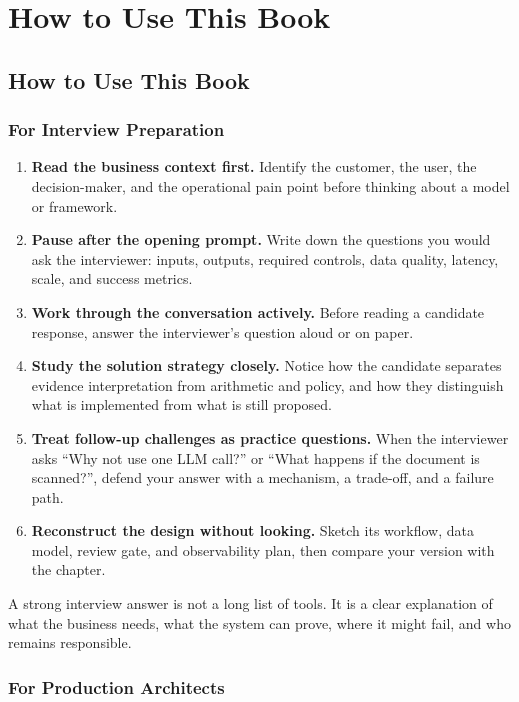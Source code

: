 \chapter*{How to Use This Book}

\section*{How to Use This Book}

\subsection*{For Interview Preparation}

\begin{enumerate}
\item \textbf{Read the business context first.} Identify the customer, the user, the decision-maker, and the operational pain point before thinking about a model or framework.
\item \textbf{Pause after the opening prompt.} Write down the questions you would ask the interviewer: inputs, outputs, required controls, data quality, latency, scale, and success metrics.
\item \textbf{Work through the conversation actively.} Before reading a candidate response, answer the interviewer's question aloud or on paper.
\item \textbf{Study the solution strategy closely.} Notice how the candidate separates evidence interpretation from arithmetic and policy, and how they distinguish what is implemented from what is still proposed.
\item \textbf{Treat follow-up challenges as practice questions.} When the interviewer asks ``Why not use one LLM call?'' or ``What happens if the document is scanned?'', defend your answer with a mechanism, a trade-off, and a failure path.
\item \textbf{Reconstruct the design without looking.} Sketch its workflow, data model, review gate, and observability plan, then compare your version with the chapter.
\end{enumerate}
A strong interview answer is not a long list of tools. It is a clear explanation of what the business needs, what the system can prove, where it might fail, and who remains responsible.

\subsection*{For Production Architects}

